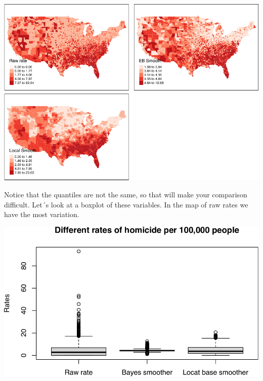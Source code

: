 \documentclass[
]{book}
\newenvironment{Shaded}{\begin{snugshade}}{\end{snugshade}}
\newcommand{\AttributeTok}[1]{\textcolor[rgb]{0.77,0.63,0.00}{#1}}
\newcommand{\CommentTok}[1]{\textcolor[rgb]{0.56,0.35,0.01}{\textit{#1}}}
\newcommand{\FunctionTok}[1]{\textcolor[rgb]{0.00,0.00,0.00}{#1}}
\newcommand{\NormalTok}[1]{#1}
\newcommand{\SpecialCharTok}[1]{\textcolor[rgb]{0.00,0.00,0.00}{#1}}
\newcommand{\StringTok}[1]{\textcolor[rgb]{0.31,0.60,0.02}{#1}}
\begin{document}
\includegraphics{crime_mapping_files/figure-latex/unnamed-chunk-116-1.pdf}

Notice that the quantiles are not the same, so that will make your comparison difficult. Let´s look at a boxplot of these variables. In the map of raw rates we have the most variation.

\begin{Shaded}
\end{Shaded}

\includegraphics{crime_mapping_files/figure-latex/unnamed-chunk-117-1.pdf}
\end{document}
